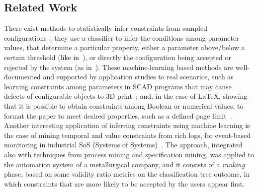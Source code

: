 \begin{tikzborder}{\cite{Gargantini16:validation}}
\begin{tikzborder}{\cite{gargantini_combinatorial_2017}}
\begin{tikzborder}{\cite{gargantini_combinatorial_2017}}
\begin{tikzborder}{\cite{garn2019}}
\begin{tikzborder}{\cite{arcaini2019achieving}}
\begin{tikzborder}{\cite{arcaini2019varivolution}}
		\subsection{Related Work}\label{sec:fmrelatedwork2}
		\bb There exist methods to statistically infer constraints from sampled configurations~\cite{chiang_unified_2011,Abukwaik_2016, temple_towards_2018,temple_learning_2017,Temple16:using,amand_towards_2019}: they use a classifier to infer the conditions among parameter values, that determine a particular property, either a parameter above/below a certain threshold (like in~\cite{temple_learning_2017}), or directly the configuration being accepted or rejected by the system (as in~\cite{Temple16:using}). These machine-learning based methods are well-documented and supported by application studies to real scenarios, such as learning constraints among parameters in SCAD programs that may cause defects of configurable objects to 3D print~\cite{amand_towards_2019}; and, in the case of \LaTeX, showing that it is possible to obtain constraints among Boolean or numerical values, to format the paper to meet desired properties, such as a defined page limit~\cite{acher_varylatex:_2018}. Another interesting application of inferring constraints using machine learning is the case of mining temporal and value constraints from rich logs, for event-based monitoring in industrial SoS (Systems of Systems)~\cite{krismayer_mining_2017}. The approach, integrated also with techniques from process mining and specification mining, was applied to the automation system of a metallurgical company, and it consists of a \textit{ranking} phase, based on some validity ratio metrics on the classification tree outcome, in which constraints that are more likely to be accepted by the users appear first.
		

\end{tikzborder}
\end{tikzborder}
\end{tikzborder}
\end{tikzborder}
\end{tikzborder}
\end{tikzborder}
